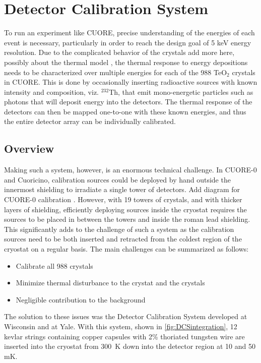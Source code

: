 \chapter{Detector Calibration System}

To run an experiment like CUORE, precise understanding of the energies of each event is necessary, particularly in order to reach the design goal of 5 keV energy resolution. Due to the complicated behavior of the crystals \color{red} add more here, possibly about the thermal model \color{black}, the thermal response to energy depositions needs to be characterized over multiple energies for each of the 988 TeO$_2$ crystals in CUORE. This is done by occasionally inserting radioactive sources with known intensity and composition, viz. $^232$Th, that emit mono-energetic particles such as photons that will deposit energy into the detectors. The thermal response of the detectors can then be mapped one-to-one with these known energies, and thus the entire detector array can be individually calibrated.

\section{Overview}

Making such a system, however, is an enormous technical challenge. In CUORE-0 and Cuoricino, calibration sources could be deployed by hand outside the innermost shielding to irradiate a single tower of detectors. \color{red} Add diagram for CUORE-0 calibration \color{black}. However, with 19 towers of crystals, and with thicker layers of shielding, efficiently deploying sources inside the cryostat requires the sources to be placed in between the towers and inside the roman lead shielding. This significantly adds to the challenge of such a system as the calibration sources need to be both inserted and retracted from the coldest region of the cryostat on a regular basis. The main challenges can be summarized as follows: 
\begin{itemize}
\item Calibrate all 988 crystals
\item Minimize thermal disturbance to the crystat and the crystals
\item Negligible contribution to the background
\end{itemize}

The solution to these issues was the Detector Calibration System developed at Wisconsin and at Yale. With this system, shown in \autoref{fig:DCSintegration}, 12 kevlar strings containing copper capsules with 2\% thoriated tungsten wire are inserted into the cryostat from 300~K down into the detector region at 10 and 50 mK.  

